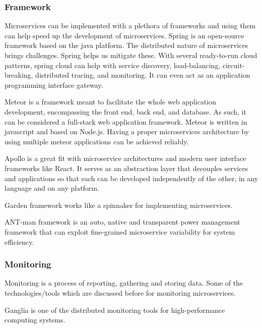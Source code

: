 \subsubsection{Framework}

Microservices can be implemented with a plethora of frameworks and using them can help speed up the development of microservices. %
%
Spring is an open-source framework based on the java platform. %
The distributed nature of microservices brings challenges. Spring helps us mitigate these. With several ready-to-run cloud patterns, spring cloud can help with service discovery, load-balancing, circuit-breaking, distributed tracing, and monitoring. It can even act as an application programming interface gateway.\cite{selmadji2020, KalskeM2017,  Santos2020}

Meteor is a framework meant to facilitate the whole web application development, encompassing the front end, back end, and database. As such, it can be considered a full-stack web application framework. Meteor is written in javascript and based on Node.js. Having a proper microservices architecture by using multiple meteor applications can be achieved reliably.\cite{Tuuli2020}

Apollo is a great fit with microservice architectures and modern user interface frameworks like React. It serves as an abstraction layer that decouples services and applications so that each can be developed independently of the other, in any language and on any platform.\cite{Kevin2015}

Garden framework works like a spinnaker for implementing microservices.\cite{Ellen2018}

ANT-man framework is an auto, native and transparent power management framework that can exploit fine-grained microservice variability for system efficiency.\cite{Hou2020}


\subsubsection{Monitoring}
Monitoring is a process of reporting, gathering and storing data. Some of the technologies/tools which are discussed before for monitoring microservices. 

Ganglia is one of the distributed monitoring tools for high-performance computing systems.\cite{Kristiani2020}

